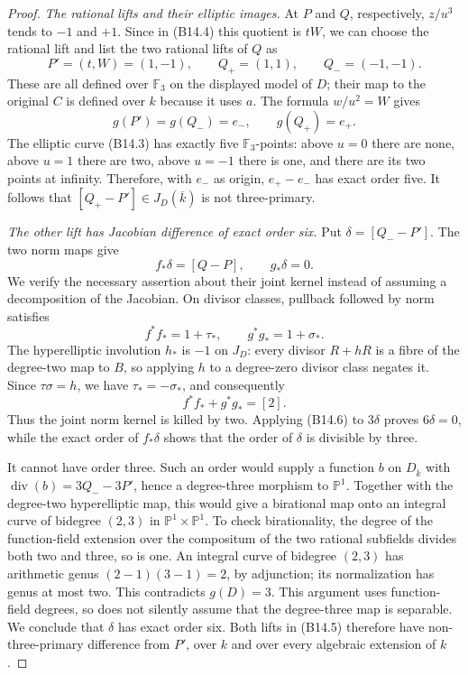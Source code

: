 \begin{proof}
\emph{The rational lifts and their elliptic images.}
At $P$ and $Q$, respectively, $z/u^3$ tends to $-1$ and $+1$.
Since in (B14.4) this quotient is $tW$, we can choose the rational
lift and list the two rational lifts of $Q$ as
\[
       P'=(t,W)=(1,-1),\qquad
       Q_+=(1,1),\qquad Q_-=(-1,-1).
 \tag{B14.5}
\]
These are all defined over $\mathbb F_3$ on the displayed model of
$D$; their map to the original $C$ is defined over $k$ because it
uses $a$. The formula $w/u^2=W$ gives
\[
            g(P')=g(Q_-)=e_-,\qquad g(Q_+)=e_+.
\]
The elliptic curve (B14.3) has exactly five $\mathbb F_3$-points:
above $u=0$ there are none, above $u=1$ there are two, above $u=-1$
there is one, and there are its two points at infinity. Therefore,
with $e_-$ as origin, $e_+-e_-$ has exact order five. It follows
that $[Q_+-P']\in J_D(\overline k)$ is not three-primary.

\emph{The other lift has Jacobian difference of exact order six.}
Put $\delta=[Q_--P']$. The two norm maps give
\[
        f_*\delta=[Q-P],\qquad g_*\delta=0.
\]
We verify the necessary assertion about their joint kernel instead
of assuming a decomposition of the Jacobian. On divisor classes,
pullback followed by norm satisfies
\[
             f^*f_*=1+\tau_*,\qquad
             g^*g_*=1+\sigma_*.
\]
The hyperelliptic involution $h_*$ is $-1$ on $J_D$: every divisor
$R+hR$ is a fibre of the degree-two map to $B$, so applying $h$
to a degree-zero divisor class negates it. Since $\tau\sigma=h$,
we have $\tau_*=-\sigma_*$, and consequently
\[
                  f^*f_*+g^*g_*=[2].
 \tag{B14.6}
\]
Thus the joint norm kernel is killed by two. Applying (B14.6) to
$3\delta$ proves $6\delta=0$, while the exact order of $f_*\delta$
shows that the order of $\delta$ is divisible by three.

It cannot have order three. Such an order would supply a function
$b$ on $D_{\overline k}$ with
$\operatorname{div}(b)=3Q_--3P'$, hence a degree-three morphism
to $\mathbb P^1$. Together with the degree-two hyperelliptic map,
this would give a birational map onto an integral curve of bidegree
$(2,3)$ in $\mathbb P^1\times\mathbb P^1$. To check birationality,
the degree of the function-field extension over the compositum of
the two rational subfields divides both two and three, so is one.
An integral curve of bidegree $(2,3)$ has arithmetic genus
$(2-1)(3-1)=2$, by adjunction; its normalization has genus at most
two. This contradicts $g(D)=3$. This argument uses function-field
degrees, so does not silently assume that the degree-three map is
separable. We conclude that $\delta$ has exact order six. Both
lifts in (B14.5) therefore have non-three-primary difference from
$P'$, over $k$ and over every algebraic extension of $k$.


\end{proof}
